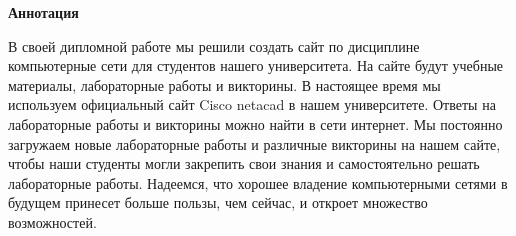 \newpage
\pagestyle{plain}

{
\begin{center}
    \Large
    \textbf{Аннотация}
\end{center}
 В своей дипломной работе мы решили создать сайт по дисциплине компьютерные сети для студентов нашего университета. На сайте будут учебные материалы, лабораторные работы и викторины. В настоящее время мы используем официальный сайт Cisco netacad в нашем университете. Ответы на лабораторные работы и викторины можно найти в сети интернет. Мы постоянно загружаем новые лабораторные работы и различные викторины на нашем сайте, чтобы наши студенты могли закрепить свои знания и самостоятельно решать лабораторные работы. Надеемся, что хорошее владение компьютерными сетями в будущем принесет больше пользы, чем сейчас, и откроет множество возможностей.

}